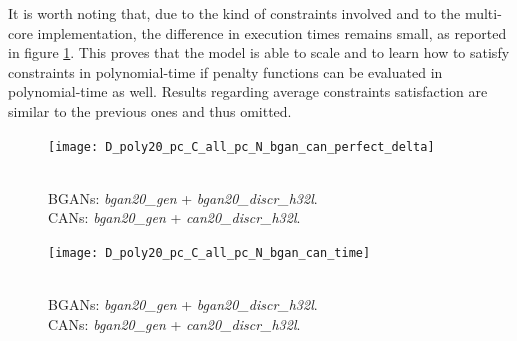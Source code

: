 It is worth noting that, due to the kind of constraints involved and to the multi-core implementation, the difference in execution times remains small, as reported in figure \ref{fig:D_poly20_pc_C_all_pc_N_bgan_can_time}. This proves that the model is able to scale and to learn how to satisfy constraints in polynomial-time if penalty functions can be evaluated in polynomial-time as well. Results regarding average constraints satisfaction are similar to the previous ones and thus omitted.

\begin{figure}[ht]
    \centering
    \begin{minipage}[t]{0.45\textwidth}
        \centering
        \texttt{[image: D\_poly20\_pc\_C\_all\_pc\_N\_bgan\_can\_perfect\_delta]}
        \caption{\\BGANs: \textit{bgan20\_gen} + \textit{bgan20\_discr\_h32l}.\\
        CANs: \textit{bgan20\_gen} + \textit{can20\_discr\_h32l}.}
        \label{fig:D_poly20_pc_C_all_pc_N_bgan_can_perfect_delta}
    \end{minipage}
    \hfill
    \begin{minipage}[t]{0.45\textwidth}
        \centering
        \texttt{[image: D\_poly20\_pc\_C\_all\_pc\_N\_bgan\_can\_time]}
        \caption{\\BGANs: \textit{bgan20\_gen} + \textit{bgan20\_discr\_h32l}.\\
        CANs: \textit{bgan20\_gen} + \textit{can20\_discr\_h32l}.}
        \label{fig:D_poly20_pc_C_all_pc_N_bgan_can_time}
    \end{minipage}
\end{figure}

